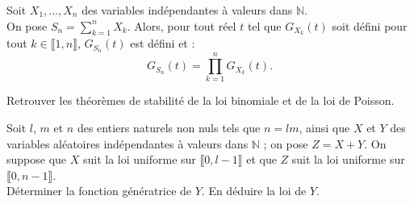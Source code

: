 \documentclass[french]{article}
\newcommand{\N}{\mathbb{N}}
\theoremstyle{plain}
\theoremstyle{definition}
\theoremstyle{remark}
\begin{document}
\begin{thm}%
	Soit $X_1,\ldots,X_n$ des variables indépendantes à valeurs dans $\N$.\\
	On pose $S_n=\displaystyle\sum_{k=1}^{n}X_k$. Alors, pour tout réel $t$ tel que $G_{X_k}(t)$ soit défini pour tout $k\in\llbracket1,n\rrbracket$, $G_{S_n}(t)$ est défini et : 
	$$G_{S_n}(t)=\prod_{k=1}^{n}G_{X_k}(t).$$
\end{thm}

\begin{exo}
	Retrouver les théorèmes de stabilité de la loi binomiale et de la loi de Poisson.
\end{exo}

\begin{exo}
	Soit $l$, $m$ et $n$ des entiers naturels non nuls tels que $n=lm$, ainsi que $X$ et $Y$ des variables aléatoires indépendantes à valeurs dans $\N$ ; on pose $Z=X+Y$. On suppose que $X$ suit la loi uniforme sur $\llbracket0,l-1\rrbracket$ et que $Z$ suit la loi uniforme sur $\llbracket0,n-1\rrbracket$.\\
	Déterminer la fonction génératrice de $Y$. En déduire la loi de $Y$.
\end{exo}
\end{document}
